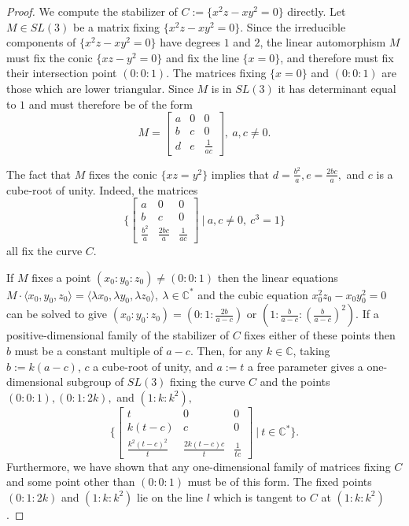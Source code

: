 \documentclass{amsart}
\newcommand{\C}{\mathbb{C}}
\numberwithin{equation}{section}
\theoremstyle{definition}
\begin{document}
\begin{proof}
    We compute the stabilizer of $C:=\{x^2z - xy^2 =0\}$ directly. Let $M \in SL(3)$ be a matrix fixing $\{x^2z - xy^2 =0\}$. Since the irreducible components of $\{x^2z - xy^2 =0\}$ have degrees $1$ and $2$, the linear automorphism $M$ must fix the conic $\{xz -y^2 =0\}$ and fix the line $\{x=0\}$, and therefore must fix their intersection point $(0:0:1)$. The matrices fixing $\{x=0\}$ and $(0:0:1)$ are those which are lower triangular. Since $M$ is in $SL(3)$ it has determinant equal to $1$ and must therefore be of the form
    $$M =\begin{bmatrix}
        a & 0 & 0 \\
        b & c & 0 \\
        d & e & \frac{1}{ac}
    \end{bmatrix}, \ a,c \neq 0.$$

The fact that $M$ fixes the conic $\{xz=y^2\}$ implies that $d= \frac{b^2}{a}, e= \frac{2bc}{a},$ and $c$ is a cube-root of unity. Indeed, the matrices
$$\bigg\{ \begin{bmatrix}
        a & 0 & 0 \\
        b & c & 0 \\
        \frac{b^2}{a} & \frac{2bc}{a} & \frac{1}{ac}
    \end{bmatrix} \ |  \ a,c \neq 0, \ c^3=1 \bigg\}$$
all fix the curve $C.$

If $M$ fixes a point $(x_0:y_0:z_0) \neq (0:0:1)$ then the linear equations $M \cdot \langle x_0, y_0, z_0 \rangle = \langle \lambda x_0, \lambda y_0, \lambda z_0 \rangle, \ \lambda \in \C^*$ and the cubic equation $x_0^2z_0-x_0y_0^2 =0$ can be solved to give $(x_0:y_0:z_0) = (0:1:\frac{2b}{a-c})$ or $(1:\frac{b}{a-c}:(\frac{b}{a-c})^2)$. If a positive-dimensional family of the stabilizer of $C$ fixes either of these points then $b$ must be a constant multiple of $a-c$. Then, for any $k \in \C$, taking $b := k(a-c)$, $c$ a cube-root of unity, and $a:=t$ a free parameter gives a one-dimensional subgroup of $SL(3)$ fixing the curve $C$ and the points $(0:0:1), (0:1:2k),$ and $(1:k:k^2),$
$$\bigg\{ \begin{bmatrix}
        t & 0 & 0 \\
        k(t-c) & c & 0 \\
        \frac{k^2(t-c)^2}{t} & \frac{2k(t-c)c}{t} & \frac{1}{tc}
    \end{bmatrix} \ | \  t \in \C^* \bigg\}.$$
Furthermore, we have shown that any one-dimensional family of matrices fixing $C$ and some point other than $(0:0:1)$ must be of this form. The fixed points $(0:1:2k)$ and $(1:k:k^2)$ lie on the line $l$ which is tangent to $C$ at  $(1:k:k^2)$.
\end{proof}
\end{document}
